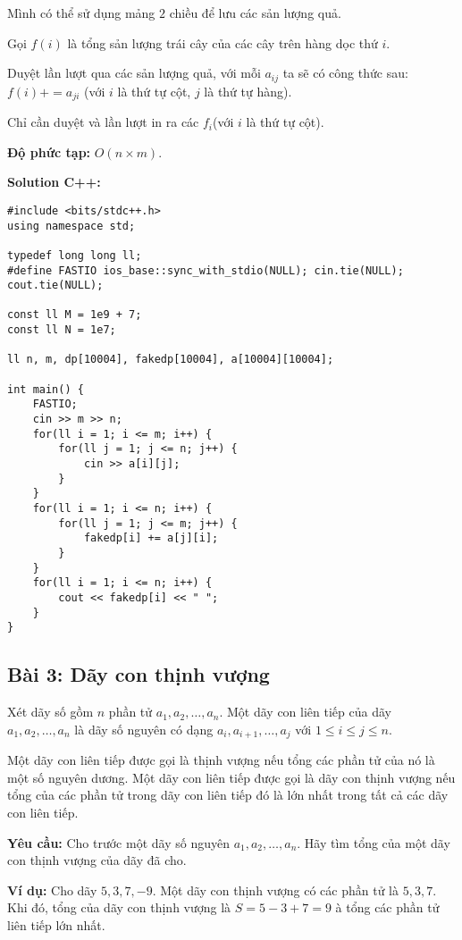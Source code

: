 \documentclass[12pt]{scrartcl}  %
\begin{document}
Mình có thể sử dụng mảng $2$ chiều để lưu các sản lượng quả.

Gọi $f(i)$ là tổng sản lượng trái cây của các cây trên hàng dọc thứ $i$.

Duyệt lần lượt qua các sản lượng quả, với mỗi $a_{ij}$ ta sẽ có công thức sau:
$f(i) += a_{ji}$ (với $i$ là thứ tự cột, $j$ là thứ tự hàng).

Chỉ cần duyệt và lần lượt in ra các $f_i$(với $i$ là thứ tự cột).

\textbf{Độ phức tạp:} $O(n \times m)$.

\textbf{Solution C++:}
\begin{lstlisting}
#include <bits/stdc++.h>
using namespace std;

typedef long long ll;
#define FASTIO ios_base::sync_with_stdio(NULL); cin.tie(NULL); cout.tie(NULL);

const ll M = 1e9 + 7;
const ll N = 1e7;

ll n, m, dp[10004], fakedp[10004], a[10004][10004];

int main() {
    FASTIO;
    cin >> m >> n;
    for(ll i = 1; i <= m; i++) {
        for(ll j = 1; j <= n; j++) {
            cin >> a[i][j];
        }
    }
    for(ll i = 1; i <= n; i++) {
        for(ll j = 1; j <= m; j++) {
            fakedp[i] += a[j][i];
        }
    }
    for(ll i = 1; i <= n; i++) {
        cout << fakedp[i] << " ";
    }
}

\end{lstlisting}

\subsection{Bài 3: Dãy con thịnh vượng}
Xét dãy số gồm $n$ phần tử $a_1, a_2, \ldots, a_n$. Một dãy con liên tiếp của dãy $a_1, a_2, \ldots, a_n$ là dãy số nguyên có dạng $a_i, a_{i+1}, \ldots, a_j$ với $1 \leq i \leq j \leq n$.

Một dãy con liên tiếp được gọi là thịnh vượng nếu tổng các phần tử của nó là một số nguyên dương. Một dãy con liên tiếp được gọi là dãy con thịnh vượng nếu tổng của các phần tử trong dãy con liên tiếp đó là lớn nhất trong tất cả các dãy con liên tiếp.

\textbf{Yêu cầu:}
Cho trước một dãy số nguyên $a_1, a_2, \ldots, a_n$. Hãy tìm tổng của một dãy con thịnh vượng của dãy đã cho. 

\textbf{Ví dụ:} Cho dãy $5, 3, 7, -9$. Một dãy con thịnh vượng có các phần tử là $5, 3, 7$. Khi đó, tổng của dãy con thịnh vượng là $S = 5 - 3 + 7 = 9$ à tổng các phần tử liên tiếp lớn nhất. 
\end{document}
